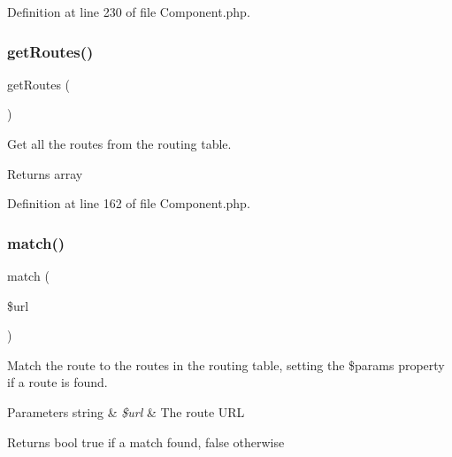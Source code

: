 Definition at line 230 of file Component.\+php.

\mbox{\label{class_zest_1_1_component_1_1_component_a18da86bf318ebe47e501aaad267d59ed}} 
\subsubsection{\texorpdfstring{get\+Routes()}{getRoutes()}}
{\footnotesize\ttfamily get\+Routes (\begin{DoxyParamCaption}{ }\end{DoxyParamCaption})}

Get all the routes from the routing table.

\begin{DoxyReturn}{Returns}
array 
\end{DoxyReturn}


Definition at line 162 of file Component.\+php.

\mbox{\label{class_zest_1_1_component_1_1_component_abd724f6a6c6ad25275026dede10a1495}} 
\subsubsection{\texorpdfstring{match()}{match()}}
{\footnotesize\ttfamily match (\begin{DoxyParamCaption}\item[{}]{\$url }\end{DoxyParamCaption})}

Match the route to the routes in the routing table, setting the \$params property if a route is found.


\begin{DoxyParams}[1]{Parameters}
string & {\em \$url} & The route U\+RL\\
\hline
\end{DoxyParams}
\begin{DoxyReturn}{Returns}
bool true if a match found, false otherwise 
\end{DoxyReturn}


